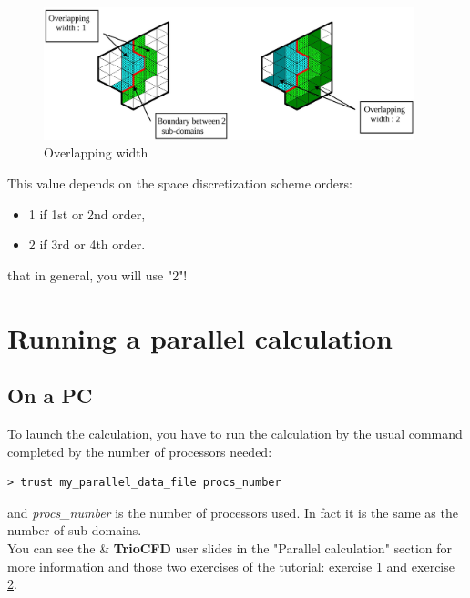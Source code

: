\begin{figure}[h!]
\begin{center}
\includegraphics[width=0.96\textwidth]{overlap.jpeg}
\caption{Overlapping width}
\label{overlap}
\end{center}
\end{figure}

This value depends on the space discretization scheme orders:
\begin{itemize}
\item 1 if 1st or 2nd order,
\item 2 if 3rd or 4th order.
\end{itemize}

\Note that in general, you will use "2"!



\section{Running a parallel calculation}

\subsection{On a PC}
To launch the calculation, you have to run the calculation by the usual command completed by the number of processors needed:
\begin{verbatim}
> trust my_parallel_data_file procs_number
\end{verbatim}
and \textit{procs\_number} is the number of processors used. In fact it is the same as the number of sub-domains.\\

You can see the \trust \& \textbf{TrioCFD} user slides in the "Parallel calculation" section for more information and those two exercises of the \trust tutorial: \href{TRUST_tutorial.pdf\#exo_para_1}{exercise 1} and \href{TRUST_tutorial.pdf\#prm_para}{exercise 2}.

